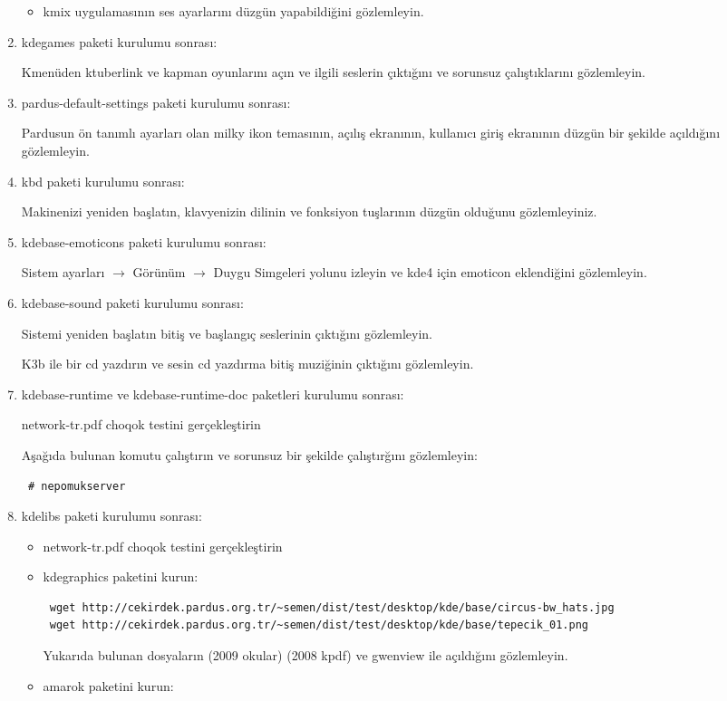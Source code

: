 \documentclass[a4paper,10pt]{article}
\begin{document}
\begin{enumerate}
\begin{itemize}
\item kmix uygulamasının ses ayarlarını düzgün yapabildiğini gözlemleyin.

\end{itemize}


\item kdegames paketi kurulumu sonrası:

Kmenüden ktuberlink ve kapman oyunlarını açın ve ilgili seslerin çıktığını ve sorunsuz çalıştıklarını gözlemleyin.

\item pardus-default-settings paketi kurulumu sonrası:

Pardusun ön tanımlı ayarları olan milky ikon temasının, açılış ekranının, kullanıcı giriş ekranının düzgün bir şekilde açıldığını gözlemleyin.

\item kbd paketi kurulumu sonrası:

Makinenizi yeniden başlatın, klavyenizin dilinin ve fonksiyon tuşlarının düzgün olduğunu gözlemleyiniz. 
\item kdebase-emoticons paketi kurulumu sonrası:

Sistem ayarları $\rightarrow$ Görünüm $\rightarrow$ Duygu Simgeleri yolunu izleyin ve kde4 için emoticon eklendiğini gözlemleyin.

\item kdebase-sound paketi kurulumu sonrası:

Sistemi yeniden başlatın bitiş ve başlangıç seslerinin çıktığını gözlemleyin.

K3b ile bir cd yazdırın ve sesin cd yazdırma bitiş muziğinin çıktığını gözlemleyin.
\item kdebase-runtime ve kdebase-runtime-doc paketleri kurulumu sonrası:

network-tr.pdf choqok testini gerçekleştirin

Aşağıda bulunan komutu çalıştırın ve sorunsuz bir şekilde çalıştırğını gözlemleyin:
\begin{verbatim}
 # nepomukserver
\end{verbatim}

 \item kdelibs paketi kurulumu sonrası:
\begin{itemize}
 \item network-tr.pdf choqok testini gerçekleştirin


 \item kdegraphics paketini kurun:
\begin{verbatim}	
 wget http://cekirdek.pardus.org.tr/~semen/dist/test/desktop/kde/base/circus-bw_hats.jpg
 wget http://cekirdek.pardus.org.tr/~semen/dist/test/desktop/kde/base/tepecik_01.png
\end{verbatim}
Yukarıda bulunan dosyaların (2009 okular) (2008 kpdf) ve gwenview ile açıldığını gözlemleyin.
\item amarok paketini kurun:


\end{itemize}
\end{enumerate}
\end{document}
